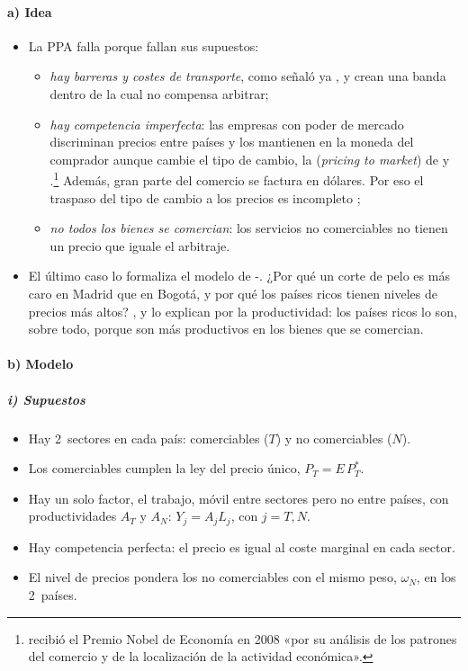 \documentclass[11pt]{article}
\begin{document}
\paragraph{a) Idea}
\begin{itemize}
\item La PPA falla porque fallan sus supuestos:
  \begin{itemize}
  \item \emph{hay barreras y costes de transporte}, como señaló ya , y crean una banda dentro de la cual no compensa arbitrar;
  \item \emph{hay competencia imperfecta}: las empresas con poder de mercado discriminan precios entre países y los mantienen en la moneda del comprador aunque cambie el tipo de cambio, la  (\emph{pricing to market}) de  y \nocite{Krugman1987PTM,Dornbusch1987Prices}.\footnote{ recibió el Premio Nobel de Economía en 2008 «por su análisis de los patrones del comercio y de la localización de la actividad económica»\nocite{Nobel2008Krugman}.} Además, gran parte del comercio se factura en dólares\nocite{Gopinath2020DCP}. Por eso el traspaso del tipo de cambio a los precios es incompleto  ;
  \item \emph{no todos los bienes se comercian}: los servicios no comerciables no tienen un precio que iguale el arbitraje.
  \end{itemize}
\item El último caso lo formaliza el modelo de -. ¿Por qué un corte de pelo es más caro en Madrid que en Bogotá, y por qué los países ricos tienen niveles de precios más altos? \textcite{Harrod1933International}, \textcite{Balassa1964} y \textcite{Samuelson1964} lo explican por la productividad: los países ricos lo son, sobre todo, porque son más productivos en los bienes que se comercian.
\end{itemize}

\paragraph{b) Modelo}
\subparagraph{i) Supuestos}
\begin{itemize}
\item Hay 2~sectores en cada país: comerciables ($T$) y no comerciables ($N$).
\item Los comerciables cumplen la ley del precio único, $P_T=E\,P^*_T$.
\item Hay un solo factor, el trabajo, móvil entre sectores pero no entre países, con productividades $A_T$ y $A_N$: $Y_j=A_jL_j$, con $j=T,N$.
\item Hay competencia perfecta: el precio es igual al coste marginal en cada sector.
\item El nivel de precios pondera los no comerciables con el mismo peso, $\omega_N$, en los 2~países.
\end{itemize}
\end{document}
